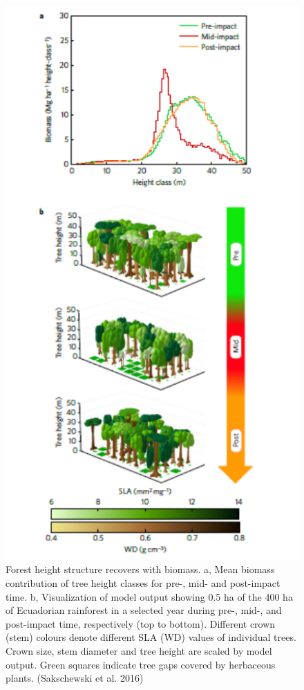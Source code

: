 \documentclass[12pt,oneside]{book}
\begin{document}
\begin{figure}

{\centering \includegraphics[width=0.8\linewidth]{figures/chap7/f721_lpjML_2} 

}

\caption{Forest height structure recovers with biomass. a, Mean biomass contribution of tree height classes for pre-, mid- and post-impact time. b, Visualization of model output showing 0.5 ha of the 400 ha of Ecuadorian rainforest in a selected year during pre-, mid-, and post-impact time, respectively (top to bottom). Different crown (stem) colours denote different SLA (WD) values of individual trees. Crown size, stem diameter and tree height are scaled by model output. Green squares indicate tree gaps covered by herbaceous plants. (Sakschewski et al. 2016)}\label{fig:f721}
\end{figure}
\end{document}
